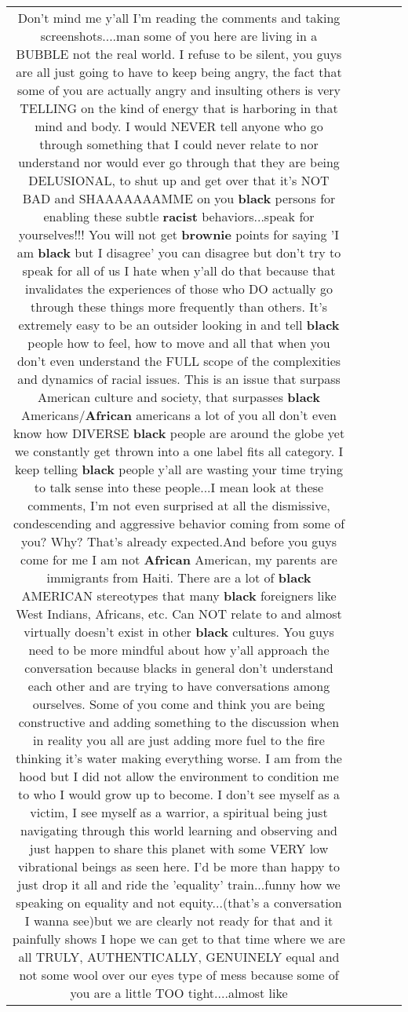 \documentclass[11pt]{article}
\newlength\mylength
\begin{document}
\begin{center}
\begin{longtable}{|C{.65\mylength}|C{.30\mylength}|C{.12\mylength}|C{.12\mylength}|C{.12\mylength}|}
  \small Don't mind me y'all I'm reading the comments and taking screenshots....man some of you here are living in a BUBBLE not the real world. I refuse to be silent, you guys are all just going to have to keep being angry, the fact that some of you are actually angry and insulting others is very TELLING on the kind of energy that is harboring in that mind and body. I would NEVER tell anyone who go through something that I could never relate to nor understand nor would ever go through that they are being DELUSIONAL, to shut up and get over that it's NOT BAD and SHAAAAAAAMME on you \textbf{black} persons for enabling these subtle \textbf{racist} behaviors...speak for yourselves!!! You will not get \textbf{b\textbf{rownie}} points for saying 'I am \textbf{black} but I disagree' you can disagree but don't try to speak for all of us I hate when y'all do that because that invalidates the experiences of those who DO actually go through these things more frequently than others. It's extremely easy to be an outsider looking in and tell \textbf{black} people how to feel, how to move and all that when you don't even understand the FULL scope of the complexities and dynamics of racial issues. This is an issue that surpass American culture and society, that surpasses \textbf{black} Americans/\textbf{African} americans a lot of you all don't even know how DIVERSE \textbf{black} people are around the globe yet we constantly get thrown into a one label fits all category. I keep telling \textbf{black} people y'all are wasting your time trying to talk sense into these people...I mean look at these comments, I'm not even surprised at all the dismissive, condescending and aggressive behavior coming from some of you? Why? That's already expected.And before you guys come for me I am not \textbf{African} American, my parents are immigrants from Haiti. There are a lot of \textbf{black} AMERICAN  stereotypes that many \textbf{black} foreigners like West Indians, Africans, etc. Can NOT relate to and almost virtually doesn't exist in other \textbf{black} cultures. You guys need to be more mindful about how y'all approach the conversation because blacks in general don't understand each other and are trying to have conversations among ourselves. Some of you come and think you are being constructive and adding something to the discussion when in reality you all are just adding more fuel to the fire thinking it's water making everything worse. I am from the hood but I did not allow the environment to condition  me to who I would grow up to become. I don't see myself as a victim, I see myself as a warrior, a spiritual being just navigating through this world learning and observing and just happen to share this planet with some VERY low vibrational beings as seen here. I'd be more than happy to just drop it all and ride the 'equality' train...funny how we speaking on equality and not equity...(that's a conversation I wanna see)but we are clearly not ready for that and it painfully shows I hope we can get to that time where we are all TRULY, AUTHENTICALLY, GENUINELY equal and not some wool over our eyes type of mess because some of you are a little TOO tight....almost like 
\end{longtable}
\end{center}
\end{document}
